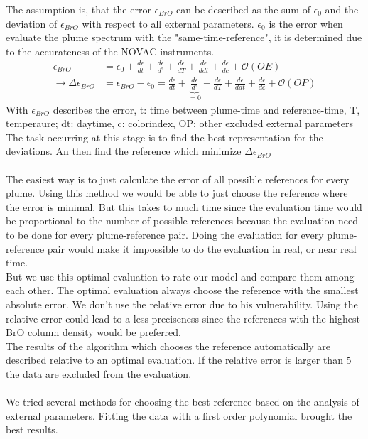 \documentclass  [
  paper    = a4,
  BCOR     = 10mm,
  twoside,
  fontsize = 12pt,
  fleqn,
  toc      = bibnumbered,
  toc      = listofnumbered,
  numbers  = noendperiod,
  headings = normal,
  listof   = leveldown,
  version  = 3.03
]                                       {scrreprt}
\begin{document}
	The assumption is, that the  error $\epsilon_{BrO}$ can be described as the sum of $\epsilon_{0}$ and the deviation of $\epsilon_{BrO}$ with respect to all external parameters. $\epsilon_{0}$ is the  error when evaluate the plume spectrum with the "same-time-reference", it is determined due to the accurateness of the NOVAC-instruments.
	\begin{align}
		\epsilon_{BrO} &=  \epsilon_{0}+\frac{d\epsilon}{dt}+\frac{d\epsilon}{d ^{\circ}}+\frac{d\epsilon}{dT}+\frac{d\epsilon}{ddt} +\frac{d\epsilon}{dc} + \mathcal{O}\left(OE\right) \\
		\rightarrow \Delta \epsilon_{BrO} &= \epsilon_{BrO} - \epsilon_{0} =\frac{d\epsilon}{dt}+\underbrace{\frac{d\epsilon}{d ^{\circ}}}_{=0}+\frac{d\epsilon}{dT}+\frac{d\epsilon}{ddt} +\frac{d\epsilon}{dc} + \mathcal{O}\left(OP\right) 
		\label{calc:err}
	\end{align}
	With $\epsilon_{BrO}$ describes the  error, t: time between plume-time and reference-time, T, temperaure; dt: daytime, c: colorindex, OP: other excluded external parameters\\
	The task occurring at this stage is to find the best representation for the deviations. An then find the reference which minimize $\Delta \epsilon_{BrO} $\\
	\\
	The easiest way is to just calculate the  error of all possible references for every plume. Using this method we would be able to just choose the reference where the  error is minimal. But this takes to much time since the evaluation time would be proportional to the number of possible references because the evaluation need to be done for every plume-reference pair. Doing the evaluation for every plume-reference pair would make it impossible to do the evaluation in real, or near real time.\\
	But we use this optimal evaluation to rate our model and compare them among each other. The optimal evaluation always choose the reference with the smallest absolute error. We don't use the relative error due to his vulnerability. Using the relative error could lead to a less preciseness since the references with the highest BrO column density would be preferred.\\
	The results of the algorithm which chooses the reference automatically are described relative to an optimal evaluation. If the relative error is larger than 5 the data are excluded from the evaluation.\\
	\\
	We tried several methods for choosing the best reference based on the analysis of external parameters. Fitting the data with a first order polynomial brought the best results.
	
\end{document}
